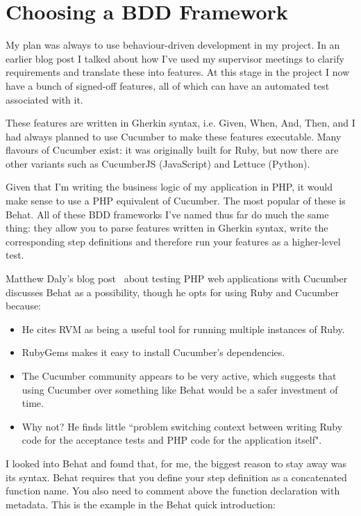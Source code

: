 \chapter{Choosing a BDD Framework} \label{appendix:bdd}

My plan was always to use behaviour-driven development in my project. In an earlier blog post I talked about how I've used my supervisor meetings to clarify requirements and translate these into features. At this stage in the project I now have a bunch of signed-off features, all of which can have an automated test associated with it.

These features are written in Gherkin syntax, i.e. Given, When, And, Then, and I had always planned to use Cucumber to make these features executable. Many flavours of Cucumber exist: it was originally built for Ruby, but now there are other variants such as CucumberJS (JavaScript) and Lettuce (Python).

Given that I'm writing the business logic of my application in PHP, it would make sense to use a PHP equivalent of Cucumber. The most popular of these is Behat. All of these BDD frameworks I've named thus far do much the same thing: they allow you to parse features written in Gherkin syntax, write the corresponding step definitions and therefore run your features as a higher-level test.

Matthew Daly's blog post~\cite{matthewDaly} about testing PHP web applications with Cucumber discusses Behat as a possibility, though he opts for using Ruby and Cucumber because:

\begin{itemize}
    \item He cites RVM as being a useful tool for running multiple instances of Ruby.

    \item RubyGems makes it easy to install Cucumber's dependencies.

    \item The Cucumber community appears to be very active, which suggests that using Cucumber over something like Behat would be a safer investment of time.

    \item Why not? He finds little ``problem switching context between writing Ruby code for the acceptance tests and PHP code for the application itself".
\end{itemize}

I looked into Behat and found that, for me, the biggest reason to stay away was its syntax. Behat requires that you define your step definition as a concatenated function name. You also need to comment above the function declaration with metadata. This is the example in the Behat quick introduction:

